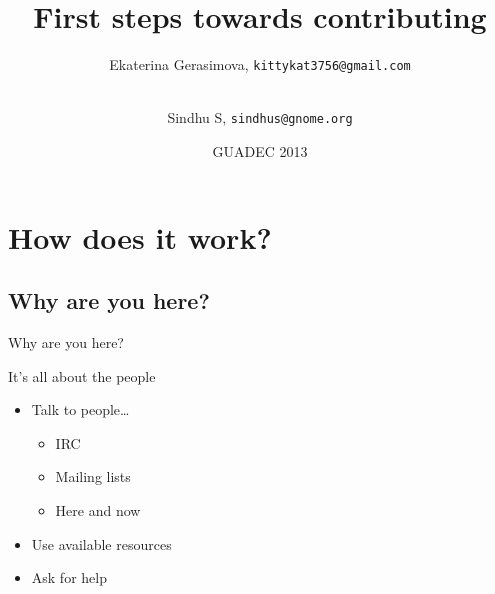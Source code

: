 \documentclass{beamer}
\title%
{First steps towards contributing}
\author
{Ekaterina Gerasimova, \texttt{kittykat3756@gmail.com} \and \\Sindhu S, \texttt{sindhus@gnome.org}}
\date%
{GUADEC 2013}
\begin{document}
\begin{frame}
  \titlepage
\end{frame}






\section{How does it work?}

\subsection{Why are you here?}

\begin{frame}{Why are you here?}%
\end{frame}

\begin{frame}{It's all about the people}
  \begin{itemize}
  \item
    Talk to people\ldots
    \begin{itemize}
    \item
      IRC
    \item
      Mailing lists
    \item
      Here and now
    \end{itemize}
  \item
    Use available resources
  \item
    Ask for help
  \end{itemize}
\end{frame}
\end{document}
